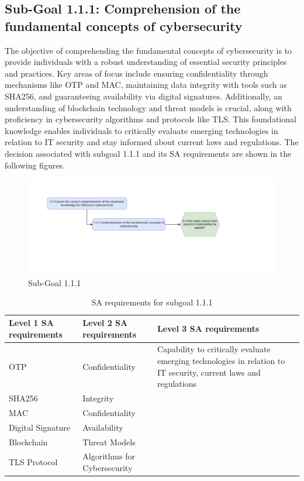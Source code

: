 \subsection{Sub-Goal 1.1.1: Comprehension of the fundamental concepts of cybersecurity }
The objective of comprehending the fundamental concepts of cybersecurity is to provide individuals with a robust understanding of essential security principles and practices. Key areas of focus include ensuring confidentiality through mechanisms like OTP and MAC, maintaining data integrity with tools such as SHA256, and guaranteeing availability via digital signatures. Additionally, an understanding of blockchain technology and threat models is crucial, along with proficiency in cybersecurity algorithms and protocols like TLS. This foundational knowledge enables individuals to critically evaluate emerging technologies in relation to IT security and stay informed about current laws and regulations.
The decision associated with subgoal 1.1.1 and its SA requirements are shown in the following figures.
\begin{figure}[H]
    \centering
    \includegraphics[width=\textwidth]{./assets/subgoal_1.1.1.png}
    \caption{Sub-Goal 1.1.1}
    \label{fig:subgoal_1.1.1}
\end{figure}

\begin{table}[H]
    \begin{center}
    \begin{tabular}{ | m{5cm} | m{5cm}| m{5cm} | } 
      \hline
      \textbf{Level 1 SA requirements} & \textbf{Level 2 SA requirements}  & \textbf{Level 3 SA requirements}  \\ 
      \hline
      OTP & Confidentiality & Capability to critically evaluate emerging technologies in relation to IT security, current laws and regulations\\ 
      \hline
      SHA256 & Integrity & \\ 
      \hline
      MAC & Confidentiality & \\ 
      \hline
      Digital Signature & Availability  & \\ 
      \hline
      Blockchain & Threat Models  & \\ 
      \hline
      TLS Protocol & Algorithms for Cybersecurity & \\ 
      \hline
    \end{tabular}
    \end{center}
    \caption{SA requirements for subgoal 1.1.1}
    \end{table}
    
